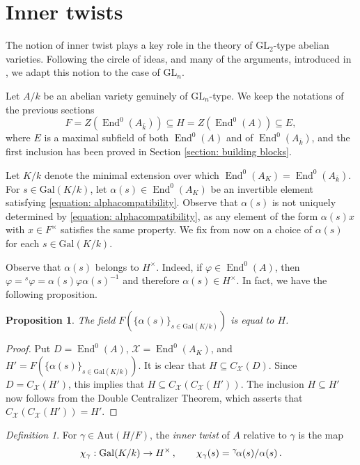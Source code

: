 \documentclass[oneside]{amsart}
\newtheorem{proposition}[theorem]{Proposition}
\theoremstyle{remark}
\newtheorem{definition}[theorem]{Definition}
\newcommand\acc[2]{\ensuremath{{}^{#1}\hskip-0.3ex{#2}}}
\newcommand{\kbar}{{\bar{k}}}
\newcommand{\Gal}{\mathrm{Gal}}
\newcommand{\GL}{\mathrm{GL}}
\newcommand{\Aut}{\mathrm{Aut}}
\newcommand{\End}{\operatorname{End}}
\numberwithin{equation}{section}
\begin{document}
\section{Inner twists}\label{section: innertwists}

The notion of inner twist plays a key role in the theory of $\GL_2$-type abelian varieties. Following the circle of ideas, and many of the arguments, introduced in \cite{Rib80}, we adapt this notion to the case of $\GL_n$. 

Let $A/k$ be an abelian variety genuinely of $\GL_n$-type. We keep the notations of the previous sections
\begin{equation}
  F = Z(\End^0(A_\kbar)) \subseteq H = Z(\End^0(A)) \subseteq E,
\end{equation}
where $E$ is a maximal subfield of both $\End^0(A)$ and of $\End^0(A_\kbar)$, and the first inclusion has been proved in Section \ref{section: building blocks}.

Let $K/k$ denote the minimal extension over which $\End^0(A_K)=\End^0(A_\kbar)$. For $s\in \Gal(K/k)$, let $\alpha(s)\in \End^0(A_K)$ be an invertible element satisfying \eqref{equation: alphacompatibility}.
Observe that $\alpha(s)$ is not uniquely determined by \eqref{equation: alphacompatibility}, as any element of the form $\alpha(s)x$ with $x\in F^\times$ satisfies the same property. We fix from now on a  choice of $\alpha(s)$ for each $s \in \Gal(K/k)$.

Observe that $\alpha(s)$ belongs to $H^\times$. Indeed, if $\varphi \in \End^0(A)$, then $\varphi = {}^s \varphi = \alpha(s)\varphi \alpha(s)^{-1}$ and therefore $\alpha(s)\in H^\times$. In fact, we have the following proposition.


\begin{proposition}
  The field $F(\{\alpha(s)\}_{s\in \Gal(K/k)})$ is equal to $H$.
\end{proposition}
\begin{proof}
Put $D=\End^0(A)$, $\mathcal{X} = \End^0(A_K)$, and $H' = F(\{\alpha(s)\}_{s\in \Gal(K/k)})$.  It is clear that $H\subseteq C_{\mathcal{X}}(D)$. Since $D = C_{\mathcal{X}}(H')$, this implies that $H\subseteq C_{\mathcal{X}}(C_{\mathcal{X}}(H'))$. The inclusion  $H\subseteq H'$ now follows from the Double Centralizer Theorem, which asserts that $C_{\mathcal{X}}(C_{\mathcal{X}}(H'))=H'$.
\end{proof}


\begin{definition}\label{definition: inner twist}
For $\gamma\in \Aut(H/F)$, the \emph{inner twist} of $A$ relative to $\gamma$ is the map
$$
\chi_\gamma: \Gal(K/k) \rightarrow H^ \times\,, \qquad \chi_\gamma(s)=\acc\gamma\alpha(s)/\alpha(s)\,.
$$
\end{definition}
\end{document}
